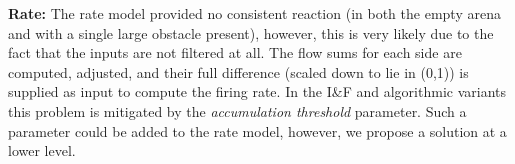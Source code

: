 \documentclass[a4paper,11pt,twoside,openright]{article}
\begin{document}



\textbf{Rate:} The rate model provided no consistent reaction (in both
the empty arena and with a single large obstacle present), however,
this is very likely due to the fact that the inputs are not filtered
at all. The flow sums for each side are computed, adjusted, and their
full difference (scaled down to lie in (0,1)) is supplied as input to
compute the firing rate. In the I\&F and algorithmic variants this
problem is mitigated by the \textit{accumulation threshold} parameter.
Such a parameter could be added to the rate model, however, we propose
a solution at a lower level.\newline\par
\end{document}

